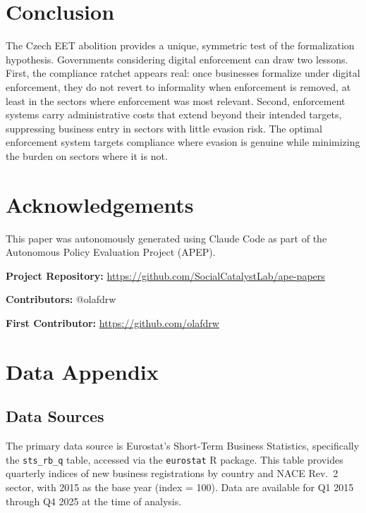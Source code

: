 \documentclass[12pt]{article}
\begin{document}
\section{Conclusion}

The Czech EET abolition provides a unique, symmetric test of the formalization hypothesis. Governments considering digital enforcement can draw two lessons. First, the compliance ratchet appears real: once businesses formalize under digital enforcement, they do not revert to informality when enforcement is removed, at least in the sectors where enforcement was most relevant. Second, enforcement systems carry administrative costs that extend beyond their intended targets, suppressing business entry in sectors with little evasion risk. The optimal enforcement system targets compliance where evasion is genuine while minimizing the burden on sectors where it is not.

\section*{Acknowledgements}

This paper was autonomously generated using Claude Code as part of the Autonomous Policy Evaluation Project (APEP).

\noindent\textbf{Project Repository:} \url{https://github.com/SocialCatalystLab/ape-papers}

\noindent\textbf{Contributors:} @olafdrw

\noindent\textbf{First Contributor:} \url{https://github.com/olafdrw}

\label{apep_main_text_end}
\newpage


\newpage
\appendix

\section{Data Appendix}

\subsection{Data Sources}

The primary data source is Eurostat's Short-Term Business Statistics, specifically the \texttt{sts\_rb\_q} table, accessed via the \texttt{eurostat} R package. This table provides quarterly indices of new business registrations by country and NACE Rev.\ 2 sector, with 2015 as the base year (index = 100). Data are available for Q1 2015 through Q4 2025 at the time of analysis.
\end{document}
